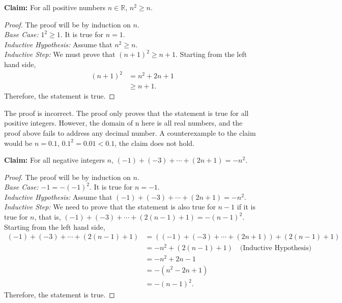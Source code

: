 \documentclass[11pt]{article}
\begin{document}
\begin{Parts}
	\Part
		\textbf{Claim:} For all positive numbers $n \in \mathbb{R}$, $n^2 \ge n$.
		\begin{proof}
			The proof will be by induction on $n$.	\\
			\emph{Base Case:} $1^2 \ge 1$. It is true for $n=1$.	\\
			\emph{Inductive Hypothesis:} Assume that $n^2 \ge n$. 	\\
			\emph{Inductive Step:} We must prove that $(n+1)^2 \ge n+1$.
			Starting from the left hand side,
			\begin{align*}
				(n+1)^2 &= n^2+2n+1 \\
						&\ge n+1.
			\end{align*}
			Therefore, the statement is true.
		\end{proof}
		
	\begin{Answer}
		The proof is incorrect. The proof only proves that the statement is true for all positive integers. However, the domain 
		of n here is all real numbers, and the proof above fails to address any decimal number. A counterexample to the claim would 
		be $n=0.1$, $0.1^2=0.01<0.1$, the claim does not hold. 
	\end{Answer}

	\Part
		\textbf{Claim:} For all negative integers $n$, $(-1) + (-3) + \cdots + (2n+1) = -n^2$.
		\begin{proof}
			The proof will be by induction on $n$.	\\
			\emph{Base Case:} $-1 = -(-1)^2$. It is true for $n=-1$. \\
			\emph{Inductive Hypothesis:} Assume that $(-1) + (-3) + \cdots + (2n+1) = -n^2$. \\
			\emph{Inductive Step:} We need to prove that the statement is also true for $n-1$ if it is true for $n$, that is,
			 $(-1) + (-3) + \cdots + (2(n-1)+1) = -(n-1)^2$. Starting from the left hand side,
			\begin{align*}
				(-1) + (-3) + \cdots + (2(n-1)+1)
				&= ((-1) + (-3) + \cdots + (2n+1))+(2(n-1)+1)	\\
				&= -n^2 + (2(n-1)+1)				\quad \text{(Inductive Hypothesis)}\\
				&= -n^2 + 2n - 1					\\
				&= -(n^2 - 2n + 1) \\
				&= -(n-1)^2.
			\end{align*}
			Therefore, the statement is true.
		\end{proof}


\end{Parts}
\end{document}
